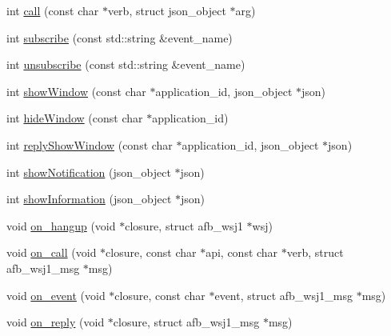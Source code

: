 \begin{DoxyCompactItemize}
\item 
int \hyperlink{class_lib_home_screen_ab5e8e8ab7d53e0f114e9e907fcbb7643}{call} (const char $\ast$verb, struct json\+\_\+object $\ast$arg)
\item 
int \hyperlink{class_lib_home_screen_aa4c189807b75d070f567967f0d690738}{subscribe} (const std\+::string \&event\+\_\+name)
\item 
int \hyperlink{class_lib_home_screen_aac03a45cbd453ba69ddb00c1016930a6}{unsubscribe} (const std\+::string \&event\+\_\+name)
\item 
int \hyperlink{class_lib_home_screen_a69fc770cb3f94d30a10c2c8c81eb892f}{show\+Window} (const char $\ast$application\+\_\+id, json\+\_\+object $\ast$json)
\item 
int \hyperlink{class_lib_home_screen_a4dbaea6c7b310e8ce7207155ff11b32a}{hide\+Window} (const char $\ast$application\+\_\+id)
\item 
int \hyperlink{class_lib_home_screen_a6310b129fc85ef0623e2e2063950cc4b}{reply\+Show\+Window} (const char $\ast$application\+\_\+id, json\+\_\+object $\ast$json)
\item 
int \hyperlink{class_lib_home_screen_a93ad567ed597a80a344ba82457c2bd7f}{show\+Notification} (json\+\_\+object $\ast$json)
\item 
int \hyperlink{class_lib_home_screen_ada999aeb0444c964428bdf1ee236727f}{show\+Information} (json\+\_\+object $\ast$json)
\item 
void \hyperlink{class_lib_home_screen_ab1c1fa69f24b981e824dd9fb810c4b74}{on\+\_\+hangup} (void $\ast$closure, struct afb\+\_\+wsj1 $\ast$wsj)
\item 
void \hyperlink{class_lib_home_screen_a608638eb87b2772a3dcc92d8ca8f3596}{on\+\_\+call} (void $\ast$closure, const char $\ast$api, const char $\ast$verb, struct afb\+\_\+wsj1\+\_\+msg $\ast$msg)
\item 
void \hyperlink{class_lib_home_screen_a9c4885b51b43ab24a548d49fb3ab2de3}{on\+\_\+event} (void $\ast$closure, const char $\ast$event, struct afb\+\_\+wsj1\+\_\+msg $\ast$msg)
\item 
void \hyperlink{class_lib_home_screen_a248d9648c6186287a7632ec1c75fc9c5}{on\+\_\+reply} (void $\ast$closure, struct afb\+\_\+wsj1\+\_\+msg $\ast$msg)
\end{DoxyCompactItemize}
